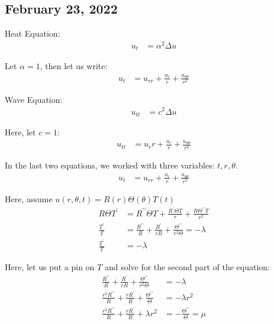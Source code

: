 \newpage
\subsection*{February 23, 2022}

Heat Equation:
%
\begin{align}
  u_t & = \alpha^2 \Delta u
\end{align}

Let $\alpha = 1$, then let us write:
%
\begin{align}
  u_t & = u_{rr} + \frac{u_r}{r} + \frac{u_{\theta\theta}}{r^2}
\end{align}

Wave Equation:
%
\begin{align}
  u_{tt} & = c^2 \Delta u
\end{align}

Here, let $c = 1$:
%
\begin{align}
  u_{tt} & = u_rr + \frac{u_r}{r} + \frac{u_{\theta\theta}}{r^2}
\end{align}

In the last two equations, we worked with three variables: $t, r, \theta$.
%
\begin{align}
  u_t & = u_{rr} + \frac{u_r}{r} + \frac{u_{\theta\theta}}{r^2}
\end{align}

Here, assume $u(r, \theta, t) = R(r)\Theta(\theta)T(t)$
%
\begin{align}
  R \Theta T^\prime & = R^{\prime\prime} \Theta T + \frac{R^\prime \Theta T}{r} + \frac{R \Theta^{\prime\prime}T}{r^2}\\
  \frac{T^\prime}{T} & = \frac{R^{\prime\prime}}{R} + \frac{R^\prime}{rR} + \frac{\Theta^{\prime\prime}}{r^2 \Theta} = -\lambda\\
  \frac{T^\prime}{T} & = -\lambda
\end{align}

Here, let us put a pin on $T$ and solve for the second part of the equation:
%
\begin{align}
  \frac{R^{\prime\prime}}{R} + \frac{R^\prime}{rR} + \frac{\Theta^{\prime\prime}}{r^2\Theta} & = - \lambda\\
  \frac{r^2R^{\prime\prime}}{R} + \frac{rR^\prime}{R} + \frac{\Theta^{\prime\prime}}{\Theta} & = - \lambda r^2\\
  \frac{r^2 R^{\prime\prime}}{R} +
  \frac{r   R^\prime}{R} +
  \lambda r^2 & = -\frac{\Theta^{\prime\prime}}{\Theta} = \mu
\end{align}

